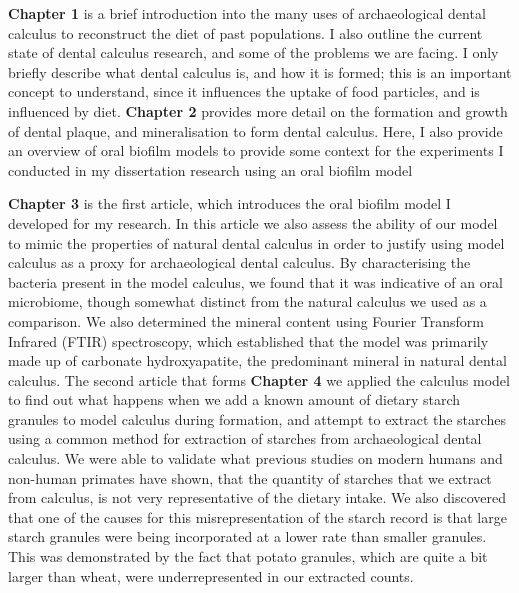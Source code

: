 \documentclass[
  b5paper,
]{book}
\begin{document}
\textbf{Chapter 1} is a brief introduction into the many uses of
archaeological dental calculus to reconstruct the diet of past
populations. I also outline the current state of dental calculus
research, and some of the problems we are facing. I only briefly
describe what dental calculus is, and how it is formed; this is an
important concept to understand, since it influences the uptake of food
particles, and is influenced by diet. \textbf{Chapter 2} provides more
detail on the formation and growth of dental plaque, and mineralisation
to form dental calculus. Here, I also provide an overview of oral
biofilm models to provide some context for the experiments I conducted
in my dissertation research using an oral biofilm model

\textbf{Chapter 3} is the first article, which introduces the oral
biofilm model I developed for my research. In this article we also
assess the ability of our model to mimic the properties of natural
dental calculus in order to justify using model calculus as a proxy for
archaeological dental calculus. By characterising the bacteria present
in the model calculus, we found that it was indicative of an oral
microbiome, though somewhat distinct from the natural calculus we used
as a comparison. We also determined the mineral content using Fourier
Transform Infrared (FTIR) spectroscopy, which established that the model
was primarily made up of carbonate hydroxyapatite, the predominant
mineral in natural dental calculus. The second article that forms
\textbf{Chapter 4} we applied the calculus model to find out what
happens when we add a known amount of dietary starch granules to model
calculus during formation, and attempt to extract the starches using a
common method for extraction of starches from archaeological dental
calculus. We were able to validate what previous studies on modern
humans and non-human primates have shown, that the quantity of starches
that we extract from calculus, is not very representative of the dietary
intake. We also discovered that one of the causes for this
misrepresentation of the starch record is that large starch granules
were being incorporated at a lower rate than smaller granules. This was
demonstrated by the fact that potato granules, which are quite a bit
larger than wheat, were underrepresented in our extracted counts.
\end{document}
